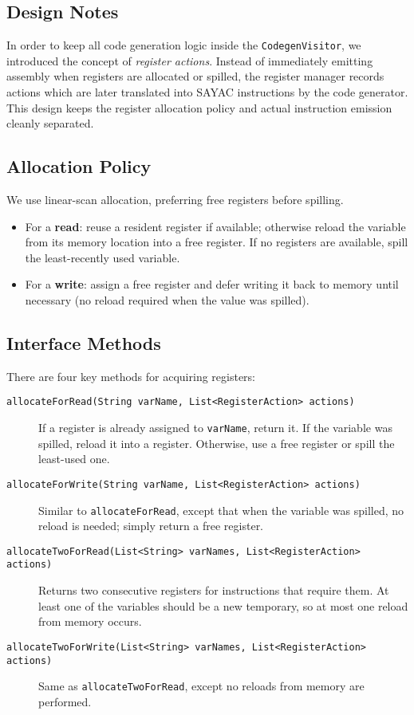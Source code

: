 \documentclass[12pt,a4paper]{report}
\begin{document}
\subsection{Design Notes}
In order to keep all code generation logic inside the \texttt{CodegenVisitor}, 
we introduced the concept of \emph{register actions}.  
Instead of immediately emitting assembly when registers are allocated or spilled, 
the register manager records actions which are later translated into SAYAC instructions 
by the code generator.  
This design keeps the register allocation policy and actual instruction emission 
cleanly separated.

\subsection{Allocation Policy}
We use linear-scan allocation, preferring free registers before spilling.  
\begin{itemize}
    \item For a \textbf{read}: reuse a resident register if available; otherwise reload 
          the variable from its memory location into a free register.  
          If no registers are available, spill the least-recently used variable.
    \item For a \textbf{write}: assign a free register and defer writing it back to memory 
          until necessary (no reload required when the value was spilled).
\end{itemize}

\subsection{Interface Methods}
There are four key methods for acquiring registers:
\begin{description}
    \item[\texttt{allocateForRead(String varName, List<RegisterAction> actions)}]  
    If a register is already assigned to \texttt{varName}, return it.  
    If the variable was spilled, reload it into a register.  
    Otherwise, use a free register or spill the least-used one.

    \item[\texttt{allocateForWrite(String varName, List<RegisterAction> actions)}]  
    Similar to \texttt{allocateForRead}, except that when the variable was spilled, 
    no reload is needed; simply return a free register.

    \item[\texttt{allocateTwoForRead(List<String> varNames, List<RegisterAction> actions)}]  
    Returns two consecutive registers for instructions that require them.  
    At least one of the variables should be a new temporary, 
    so at most one reload from memory occurs.

    \item[\texttt{allocateTwoForWrite(List<String> varNames, List<RegisterAction> actions)}]  
    Same as \texttt{allocateTwoForRead}, except no reloads from memory are performed.
\end{description}
\end{document}

